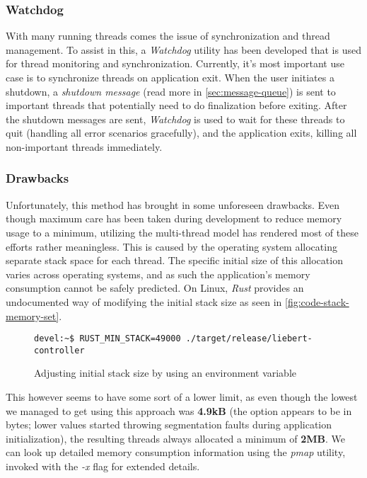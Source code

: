         \subsubsection{Watchdog}
            With many running threads comes the issue of synchronization and thread management. To assist in this, a \textit{Watchdog} utility has been developed that is used for thread monitoring and synchronization. Currently, it's most important use case is to synchronize threads on application exit. When the user initiates a shutdown, a \textit{shutdown message} (read more in \autoref{sec:message-queue}) is sent to important threads that potentially need to do finalization before exiting. After the shutdown messages are sent, \textit{Watchdog} is used to wait for these threads to quit (handling all error scenarios gracefully), and the application exits, killing all non-important threads immediately.
        
        \subsubsection{Drawbacks}
            Unfortunately, this method has brought in some unforeseen drawbacks. Even though maximum care has been taken during development to reduce memory usage to a minimum, utilizing the multi-thread model has rendered most of these efforts rather meaningless. This is caused by the operating system allocating separate stack space for each thread. The specific initial size of this allocation varies across operating systems, and as such the application's memory consumption cannot be safely predicted. On Linux, \textit{Rust} provides an undocumented way of modifying the initial stack size as seen in  \autoref{fig:code-stack-memory-set}.
            
            \begin{figure}[!htb]
                \centering
                \begin{BVerbatim}
devel:~$ RUST_MIN_STACK=49000 ./target/release/liebert-controller
                \end{BVerbatim}
                \caption{Adjusting initial stack size by using an environment variable}
                \label{fig:code-stack-memory-set}
            \end{figure}
            
            This however seems to have some sort of a lower limit, as even though the lowest we managed to get using this approach was \textbf{4.9kB} (the option appears to be in bytes; lower values started throwing segmentation faults during application initialization), the resulting threads always allocated a minimum of \textbf{2MB}. We can look up detailed memory consumption information using the \textit{pmap} utility, invoked with the \textit{-x} flag for extended details.
            
